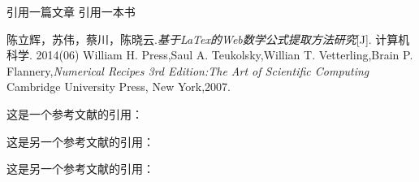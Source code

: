 \documentclass{article}
\begin{document}

	引用一篇文章\cite{article1} 引用一本书\cite{book1}

	\begin{thebibliography}{99}
		陈立辉，苏伟，蔡川，陈晓云.\emph{基于LaTex的Web数学公式提取方法研究}[J]. 计算机科学. 2014(06)
		William H. Press,Saul A. Teukolsky,Willian T. Vetterling,Brain P. Flannery,\emph{Numerical Recipes 3rd Edition:The Art of Scientific Computing} Cambridge University Press, New York,2007.
	\end{thebibliography}
	
	这是一个参考文献的引用： \cite{mittelbach2004} %
	
	这是另一个参考文献的引用： \cite{OsbandDeep}
	
	这是另一个参考文献的引用： \cite{_expectimaxdouble_nodate}
	
	
	
	
\end{document}
